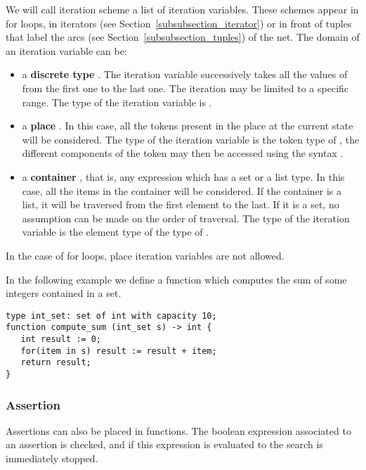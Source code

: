  We will call iteration scheme a list of
iteration variables.  These schemes appear in for loops, in iterators
(see Section~\ref{subsubsection_iterator}) or in front of tuples that
label the arcs (see Section~\ref{subsubsection_tuples}) of the net.
The domain of an iteration variable  can be:
\begin{itemize}
\item
  a {\bf discrete type} .  The iteration variable successively
  takes all the values of  from the first one to the last one.
  The iteration may be limited to a specific range.  The type of the
  iteration variable is .
\item
  a {\bf place} .  In this case, all the tokens present in the
  place at the current state will be considered.  The type of the
  iteration variable is the token type of , the different
  components of the token may then be accessed using the syntax
  .
\item
  a {\bf container} , that is, any expression which has a set or
  a list type.  In this case, all the items in the container will be
  considered.  If the container is a list, it will be traversed from
  the first element to the last.  If it is a set, no assumption can be
  made on the order of traversal.  The type of the iteration variable
  is the element type of the type of .
\end{itemize}
In the case of for loops, place iteration variables are not allowed.

In the following example we define a function 
which computes the sum of some integers contained in a set.
\begin{lstlisting}
type int_set: set of int with capacity 10;
function compute_sum (int_set s) -> int {
   int result := 0;
   for(item in s) result := result + item;
   return result;
}
\end{lstlisting}

\fordef


\subsubsection{Assertion}
Assertions can also be placed in functions.  The boolean expression
associated to an assertion is checked, and if this expression is
evaluated to  the search is immediately stopped.\\

\assertstatdef




